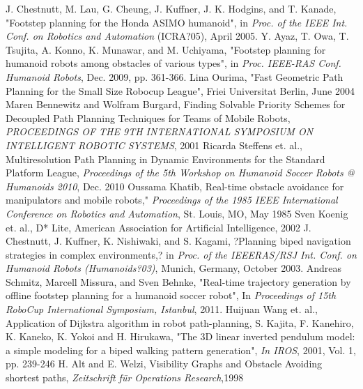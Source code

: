 \documentclass[letterpaper, 10 pt, conference]{ieeeconf}  %
\begin{document}
\addtolength{\textheight}{-12cm}  

\begin{thebibliography}{99}
J. Chestnutt, M. Lau, G. Cheung, J. Kuffner, J. K. Hodgins, and
T. Kanade, "Footstep planning for the Honda ASIMO humanoid", in
\emph{Proc. of the IEEE Int. Conf. on Robotics and Automation} (ICRA?05),
April 2005.
 Y. Ayaz, T. Owa, T. Tsujita, A. Konno, K. Munawar, and M. Uchiyama,
"Footstep planning for humanoid robots among obstacles of various
types", in \emph{Proc. IEEE-RAS Conf. Humanoid Robots}, Dec. 2009, pp. 361-366.
 Lina Ourima, "Fast Geometric Path Planning for the Small Size Robocup League", Friei Universitat Berlin, June 2004
 Maren Bennewitz and Wolfram Burgard, Finding Solvable Priority Schemes for Decoupled Path Planning Techniques for Teams of Mobile Robots, \emph{PROCEEDINGS OF THE 9TH INTERNATIONAL SYMPOSIUM ON INTELLIGENT ROBOTIC SYSTEMS}, 2001
 Ricarda Steffens et. al., Multiresolution Path Planning in Dynamic Environments for the Standard Platform League, \emph{Proceedings of the 5th Workshop on Humanoid Soccer Robots @ Humanoids 2010}, Dec. 2010
 Oussama Khatib, Real-time obstacle avoidance
for manipulators and mobile robots," \emph{Proceedings
of the 1985 IEEE International Conference
on Robotics and Automation}, St. Louis, MO, May
1985
 Sven Koenig et. al., D* Lite, American Association for Artificial Intelligence, 2002
 J. Chestnutt, J. Kuffner, K. Nishiwaki, and S. Kagami, ?Planning biped
navigation strategies in complex environments,? in \emph{Proc. of the IEEERAS/RSJ
Int. Conf. on Humanoid Robots (Humanoids?03)}, Munich,
Germany, October 2003.
 Andreas Schmitz, Marcell Missura, and Sven Behnke, "Real-time trajectory generation
by offline footstep planning for a humanoid soccer robot",  In \emph{Proceedings of
15th RoboCup International Symposium, Istanbul}, 2011.
 Huijuan Wang  et. al., Application of Dijkstra algorithm in robot
path-planning, 
 S. Kajita, F. Kanehiro, K. Kaneko, K. Yokoi and H. Hirukawa, "The 3D linear inverted
pendulum model: a simple modeling for a biped walking pattern generation", \emph{In
IROS}, 2001, Vol. 1, pp. 239-246
 H. Alt and E. Welzi, Visibility Graphs and Obstacle Avoiding shortest paths, \emph{Zeitschrift für Operations Research},1998


\end{thebibliography}
\end{document}
